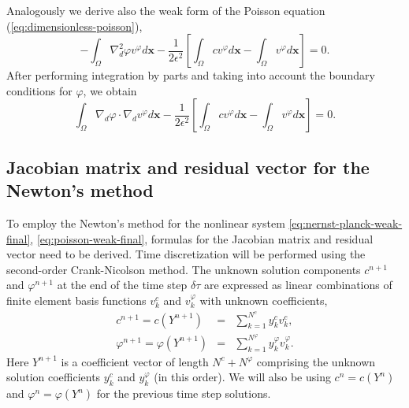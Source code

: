 Analogously we derive also the weak form of the Poisson equation (\ref{eq:dimensionless-poisson}),
\begin{equation}
  -\int_{\Omega}\nabla_d^2\varphi v^\varphi d\mathbf{x}-
  \frac{1}{2\epsilon^2}\left[\int_{\Omega}cv^\varphi d\mathbf{x}-
  \int_{\Omega}v^\varphi d\mathbf{x}\right]=0.
  \label{eq:poisson-weak1}
\end{equation}
After performing integration by parts and taking into account the boundary 
conditions for $\varphi$, we obtain
\begin{equation}
  \int_{\Omega}\nabla_d\varphi\cdot\nabla_d v^\varphi d\mathbf{x}-
  \frac{1}{2\epsilon^2}\left[\int_{\Omega}cv^\varphi d\mathbf{x}-
  \int_{\Omega}v^\varphi d\mathbf{x}\right]=0.
  \label{eq:poisson-weak-final}
\end{equation}


\subsection{Jacobian matrix and residual vector for the Newton's method}
To employ the Newton's method for the nonlinear system \eqref{eq:nernst-planck-weak-final},
\eqref{eq:poisson-weak-final}, formulas for the Jacobian matrix and residual vector need to
be derived. Time discretization will be performed using the second-order Crank-Nicolson 
method. The unknown solution components 
$c^{n+1}$ and $\varphi^{n+1}$ at the end of the time step $\delta\tau$ are expressed 
as linear combinations of finite element basis functions $v_k^{c}$ 
and $v_k^{\varphi}$ with unknown coefficients,
\begin{eqnarray}
  c^{n+1} = c(Y^{n+1}) &=& \sum_{k=1}^{N^c} y_k^{c} v_k^{c}, \label{eq:cnotation}\\
  \varphi^{n+1} = \varphi(Y^{n+1}) &=& \sum_{k=1}^{N^{\varphi}} y_k^{\varphi} v_k^{\varphi}\label{eq:phinotation}.
\end{eqnarray}
Here $Y^{n+1}$ is a coefficient vector of length $N^c + N^{\varphi}$ comprising the unknown 
solution coefficients $y_k^{c}$ and $y_k^{\varphi}$ (in this order). We will also be 
using $c^n = c(Y^n)$ and $\varphi^n = \varphi(Y^n)$ for the previous time step solutions.

